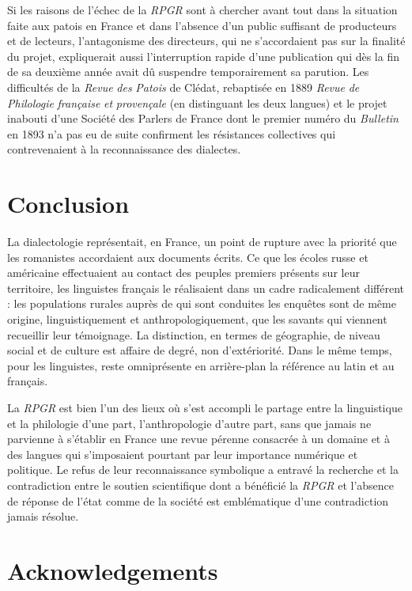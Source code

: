\documentclass[output=paper]{langsci/langscibook}
\begin{document}
Si les raisons de l’échec de la \textit{RPGR} sont à chercher avant tout dans la situation faite aux patois en France et dans l’absence d’un public suffisant de producteurs et de lecteurs, l’antagonisme des directeurs, qui ne s’accordaient pas sur la finalité du projet, expliquerait aussi l’interruption rapide d’une publication qui dès la fin de sa deuxième année avait dû suspendre temporairement sa parution. Les difficultés de la \textit{Revue} \textit{des} \textit{Patois} de Clédat, rebaptisée en 1889 \textit{Revue} \textit{de} \textit{Philologie} \textit{française} \textit{et} \textit{provençale} (en distinguant les deux langues) et le projet inabouti d’une Société des Parlers de France dont le premier numéro du \textit{Bulletin} en 1893 n’a pas eu de suite confirment les résistances collectives qui contrevenaient à la reconnaissance des dialectes. 

\section{Conclusion} 

La dialectologie représentait, en France, un point de rupture avec la priorité que les romanistes accordaient aux documents écrits. Ce que les écoles russe et américaine effectuaient au contact des peuples premiers présents sur leur territoire, les linguistes français le réalisaient dans un cadre radicalement différent : les populations rurales auprès de qui sont conduites les enquêtes sont de même origine, linguistiquement et anthropologiquement, que les savants qui viennent recueillir leur témoignage. La distinction, en termes de géographie, de niveau social et de culture est affaire de degré, non d’extériorité. Dans le même temps, pour les linguistes, reste omniprésente en arrière-plan la référence au latin et au français.

La \textit{RPGR} est bien l’un des lieux où s’est accompli le partage entre la linguistique et la philologie d’une part, l’anthropologie d’autre part, sans que jamais ne parvienne à s’établir en France une revue pérenne consacrée à un domaine et à des langues qui s’imposaient pourtant par leur importance numérique et politique. Le refus de leur reconnaissance symbolique a entravé la recherche et la contradiction entre le soutien scientifique dont a bénéficié la \textit{RPGR} et l’absence de réponse de l’état comme de la société est emblématique d’une contradiction jamais résolue.



\section*{Acknowledgements}


{\sloppy\printbibliography[heading=subbibliography,notkeyword=this]}
\end{document}

